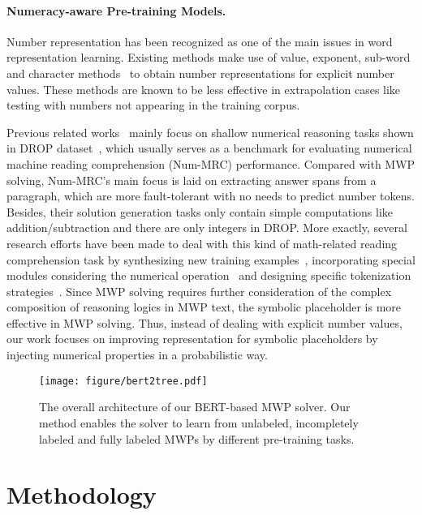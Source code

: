 \documentclass[11pt]{article}
\begin{document}
\paragraph{Numeracy-aware Pre-training Models.}
Number representation has been recognized as one of the main issues in word representation learning. Existing methods make use of value, exponent, sub-word and character methods~\cite{DBLP:conf/naacl/ThawaniPIS21} to obtain number representations for explicit number values. These methods are known to be less effective in extrapolation cases like testing with numbers not appearing in the training corpus. 

Previous related works~\cite{DBLP:conf/emnlp/AndorHLP19,DBLP:conf/emnlp/WallaceWLSG19,DBLP:conf/acl/GevaGB20} mainly focus on shallow numerical reasoning tasks shown in DROP dataset~\cite{DBLP:conf/naacl/DuaWDSS019}, which usually serves as a benchmark for evaluating numerical machine reading comprehension (Num-MRC) performance. Compared with MWP solving, Num-MRC's main focus is laid on extracting answer spans from a paragraph, which are more fault-tolerant with no needs to predict number tokens. Besides, their solution generation tasks only contain simple computations like addition/subtraction and there are only integers in DROP. More exactly, several research efforts have been made to deal with this kind of math-related reading comprehension task by synthesizing new training examples~\cite{DBLP:conf/acl/GevaGB20}, incorporating special modules considering the numerical operation~\cite{DBLP:conf/emnlp/AndorHLP19} and designing specific tokenization strategies~\cite{DBLP:conf/emnlp/0001RTER20}. Since MWP solving requires further consideration of the complex composition of reasoning logics in MWP text, the symbolic placeholder is more effective in MWP solving. Thus, instead of dealing with explicit number values, our work focuses on improving representation for symbolic placeholders by injecting numerical properties in a probabilistic way. 
\begin{figure}
\centering 
\texttt{[image: figure/bert2tree.pdf]} 
\caption{The overall architecture of our BERT-based MWP solver. Our method enables the solver to learn from unlabeled, incompletely labeled and fully labeled MWPs by different pre-training tasks.} 
\label{fig:network} 
\end{figure}

\section{Methodology}
\end{document}
